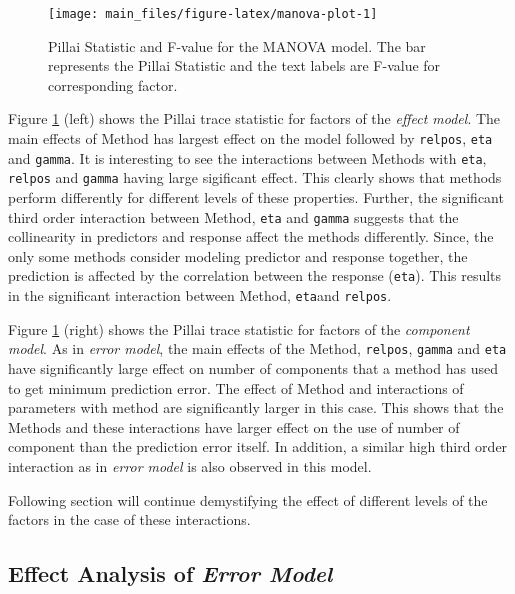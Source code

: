 \documentclass[12pt,3p,authoryear]{elsarticle}
\providecommand{\tightlist}{%
  \setlength{\itemsep}{0pt}\setlength{\parskip}{0pt}}
\begin{document}
\begin{figure}
\texttt{[image: main\_files/figure-latex/manova-plot-1]} \caption{Pillai Statistic and F-value for the MANOVA model. The
bar represents the Pillai Statistic and the text labels are F-value for
corresponding factor.}\label{fig:manova-plot}
\end{figure}

\begin{description}
\tightlist
\item[\emph{Error Model}:]
Figure \ref{fig:manova-plot} (left) shows the Pillai trace statistic for
factors of the \emph{effect model}. The main effects of Method has
largest effect on the model followed by \texttt{relpos}, \texttt{eta}
and \texttt{gamma}. It is interesting to see the interactions between
Methods with \texttt{eta}, \texttt{relpos} and \texttt{gamma} having
large sigificant effect. This clearly shows that methods perform
differently for different levels of these properties. Further, the
significant third order interaction between Method, \texttt{eta} and
\texttt{gamma} suggests that the collinearity in predictors and response
affect the methods differently. Since, the only some methods consider
modeling predictor and response together, the prediction is affected by
the correlation between the response (\texttt{eta}). This results in the
significant interaction between Method, \texttt{eta}and \texttt{relpos}.
\item[\emph{Component Model}:]
Figure \ref{fig:manova-plot} (right) shows the Pillai trace statistic
for factors of the \emph{component model}. As in \emph{error model}, the
main effects of the Method, \texttt{relpos}, \texttt{gamma} and
\texttt{eta} have significantly large effect on number of components
that a method has used to get minimum prediction error. The effect of
Method and interactions of parameters with method are significantly
larger in this case. This shows that the Methods and these interactions
have larger effect on the use of number of component than the prediction
error itself. In addition, a similar high third order interaction as in
\emph{error model} is also observed in this model.
\end{description}

Following section will continue demystifying the effect of different
levels of the factors in the case of these interactions.

\hypertarget{effect-analysis-of-error-model}{%
\subsection{\texorpdfstring{Effect Analysis of \emph{Error
Model}}{Effect Analysis of Error Model}}\label{effect-analysis-of-error-model}}
\end{document}
